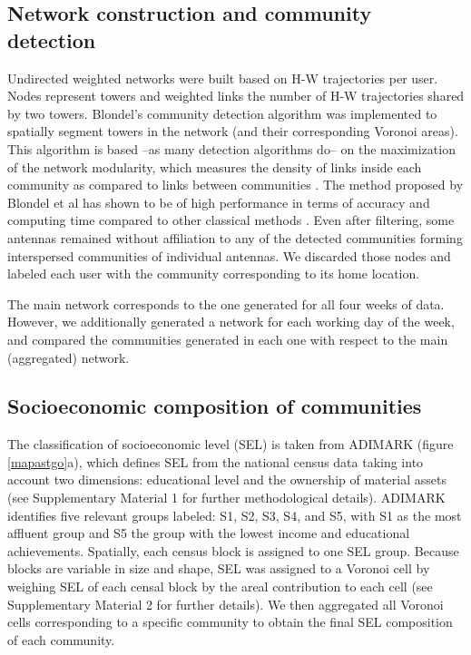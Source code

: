\documentclass[%
preprint,
 amsmath,amssymb,
pra,
]{revtex4-1}
\begin{document}
\subsection{Network construction and community detection}
Undirected weighted networks were built based on H-W trajectories per user. Nodes represent towers and weighted links the number of H-W trajectories shared by two towers. Blondel's community detection algorithm \cite{blondel2008fast} was implemented to spatially segment towers in the network (and their corresponding Voronoi areas). This algorithm is based --as many detection algorithms do-- on the maximization of the network modularity, which measures the density of links inside each community as compared to links between communities \cite{newman2006modularity,girvan2002community,blondel2008fast}. The method proposed by Blondel et al \cite{blondel2008fast} has shown to be of high performance in terms of accuracy and computing time compared to other classical methods \cite{yang2016comparative}.
%
Even after filtering, some antennas remained without affiliation to any of the detected communities forming interspersed communities of individual antennas.  We discarded those nodes and labeled each user with the community corresponding to its home location. 

The main network corresponds to the one generated for all four weeks of data. However, we additionally generated a network for each working day of the week, and compared the communities generated in each one with respect to the main (aggregated) network.

\subsection{Socioeconomic composition of communities}
The classification of socioeconomic level (SEL) is taken from ADIMARK \cite{adimark2009mapa} (figure \ref{mapastgo}a), which defines SEL from the national census data taking into account two dimensions: educational level and the ownership of material assets (see Supplementary Material 1 for further methodological details). ADIMARK identifies five relevant groups labeled: S1, S2, S3, S4, and S5, with S1 as the most affluent group and S5 the group with the lowest income and educational achievements. Spatially, each census block is assigned to one SEL group. Because blocks are variable in size and shape, SEL was assigned to a Voronoi cell by weighing SEL of each censal block by the areal contribution to each cell (see Supplementary Material 2 for further details). We then aggregated all Voronoi cells corresponding to a specific community to obtain the final SEL composition of each community.
\end{document}
